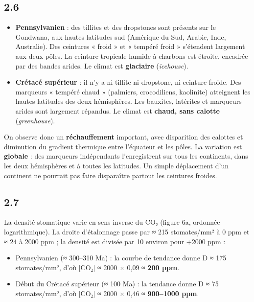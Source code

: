\documentclass[11pt,a4paper]{article}
\providecommand{\tightlist}{\setlength{\itemsep}{0pt}\setlength{\parskip}{0pt}}
\newcommand{\equationajustee}[1]{%
  \sbox{\boiteequation}{$\displaystyle #1$}%
  \ifdim\wd\boiteequation>\linewidth
    \[\resizebox{\linewidth}{!}{\usebox{\boiteequation}}\]%
  \else
    \[#1\]%
  \fi}
\begin{document}
\hypertarget{section-16}{%
\subsection{2.6}\label{section-16}}

\begin{itemize}
\tightlist
\item
  \textbf{Pennsylvanien} : des tillites et des dropstones sont présents sur le Gondwana, aux hautes latitudes sud (Amérique du Sud, Arabie, Inde, Australie). Des ceintures « froid » et « tempéré froid » s'étendent largement aux deux pôles. La ceinture tropicale humide à charbons est étroite, encadrée par des bandes arides. Le climat est \textbf{glaciaire} (\emph{icehouse}).
\item
  \textbf{Crétacé supérieur} : il n'y a ni tillite ni dropstone, ni ceinture froide. Des marqueurs « tempéré chaud » (palmiers, crocodiliens, kaolinite) atteignent les hautes latitudes des deux hémisphères. Les bauxites, latérites et marqueurs arides sont largement répandus. Le climat est \textbf{chaud, sans calotte} (\emph{greenhouse}).
\end{itemize}

On observe donc un \textbf{réchauffement} important, avec disparition des calottes et diminution du gradient thermique entre l'équateur et les pôles. La variation est \textbf{globale} : des marqueurs indépendants l'enregistrent sur tous les continents, dans les deux hémisphères et à toutes les latitudes. Un simple déplacement d'un continent ne pourrait pas faire disparaître partout les ceintures froides.

\hypertarget{section-17}{%
\subsection{2.7}\label{section-17}}

La densité stomatique varie en sens inverse du CO₂ (figure 6a, ordonnée logarithmique). La droite d'étalonnage passe par ≈ 215 stomates/mm² à 0 ppm et ≈ 24 à 2000 ppm ; la densité est divisée par 10 environ pour +2000 ppm :

\equationajustee{[\mathrm{CO_2}] \approx 2000\,\log_{10}\!\left(\frac{215}{D}\right)\ \text{ppm}}

\begin{itemize}
\tightlist
\item
  Pennsylvanien (≈ 300--310 Ma) : la courbe de tendance donne D ≈ 175 stomates/mm², d'où {[}CO₂{]} ≈ 2000 × 0,09 ≈ \textbf{200 ppm}.
\item
  Début du Crétacé supérieur (≈ 100 Ma) : la tendance donne D ≈ 75 stomates/mm², d'où {[}CO₂{]} ≈ 2000 × 0,46 ≈ \textbf{900--1000 ppm}.
\end{itemize}
\end{document}
